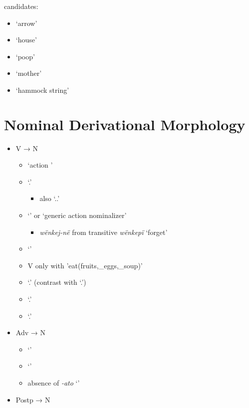 \documentclass{memoir}
\begin{document}
candidates:

\begin{itemize}
\tightlist
\item
  `arrow'
\item
  `house'
\item
  `poop'
\item
  `mother'
\item
  `hammock string'
\end{itemize}

\section{\texorpdfstring{Nominal Derivational Morphology
\label{sec:nounderiv}}{Nominal Derivational Morphology }}

\begin{itemize}
\tightlist
\item
  V → N

  \begin{itemize}
  \tightlist
  \item
     `action '
  \item
     `.'

    \begin{itemize}
    \tightlist
    \item
      also `..'
    \end{itemize}
  \item
     `' or `generic action nominalizer'

    \begin{itemize}
    \tightlist
    \item
      \emph{wënkej-në} from transitive \emph{wënkepï} `forget'
    \end{itemize}
  \item
     `'
  \item
    V only with  'eat(fruits,\_eggs,\_soup)'
  \item
     `.' (contrast with 
    `.')
  \item
     `.'
  \item
     `.'
  \end{itemize}
\item
  Adv → N

  \begin{itemize}
  \tightlist
  \item
     `'
  \item
     `'
  \item
    absence of \emph{-ato} `'
  \end{itemize}
\item
  Postp → N


\end{itemize}
\end{document}

